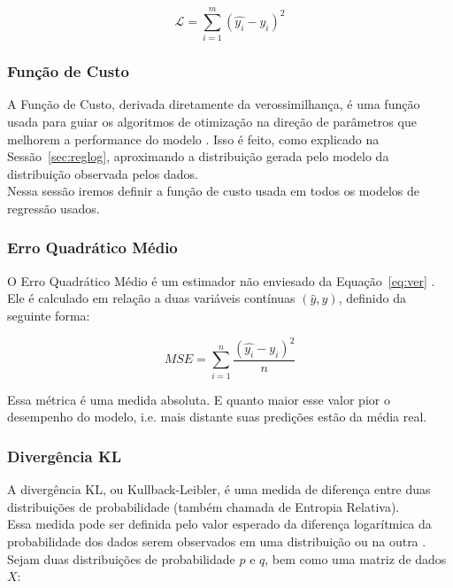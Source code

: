 \begin{equation}
  \label{eq:logver2}
  \mathcal{L}=  \sum^m_{i=1} (\hat{y_i}-y_i)^2
\end{equation}


\subsubsection{Função de Custo}

A Função de Custo, derivada diretamente da verossimilhança,
é uma função usada para guiar os algoritmos de otimização na direção de parâmetros que melhorem a performance do modelo \citep{dlbook}. Isso é feito, como explicado na Sessão~\ref{sec:reglog}, aproximando a distribuição gerada pelo modelo da distribuição observada pelos dados. \\

Nessa sessão iremos definir a função de custo usada em todos os modelos de regressão usados. \\

\subsubsection{Erro Quadrático Médio}
\label{sec:MSE}

O Erro Quadrático Médio é um estimador não enviesado da Equação~\ref{eq:ver}
\citep{dlbook}. Ele é calculado em relação a duas variáveis contínuas
$(\hat{y},y)$, definido da seguinte forma:

\[MSE = \sum^n_{i=1}\frac{(\hat{y_i} - y_i)^2}{n}\]

Essa métrica é uma medida absoluta. E quanto maior esse valor pior o desempenho
do modelo, i.e. mais distante suas predições estão da média real. \\

\subsubsection{Divergência KL}

A divergência KL, ou Kullback-Leibler, é uma medida de diferença entre duas distribuições de probabilidade (também chamada de Entropia Relativa). \\
Essa medida pode ser definida pelo valor esperado da diferença logarítmica da probabilidade dos dados serem observados em uma distribuição ou na outra \citep{dlbook}. \\
Sejam duas distribuições de probabilidade $p$ e $q$, bem como uma matriz de dados $X$: \\

